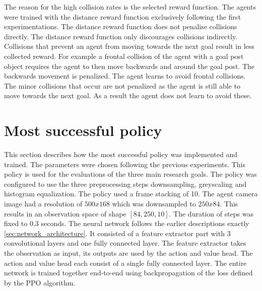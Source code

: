 The reason for the high collision rates is the selected reward function. The agents were trained with the distance reward function exclusively following the first experimentations. The distance reward function does not penalise collisions directly. The distance reward function only discourages collisions indirectly. Collisions that prevent an agent from moving towards the next goal result in less collected reward. For example a frontal collision of the agent with a goal post object requires the agent to then move backwards and around the goal post. The backwards movement is penalized. The agent learns to avoid frontal collisions.
The minor collisions that occur are not penalized as the agent is still able to move towards the next goal. As a result the agent does not learn to avoid these.




\section{Most successful policy}


This section describes how the most successful policy was implemented and trained. The parameters were chosen following the previous experiments. This policy is used for the evaluations of the three main research goals.
The policy was configured to use the three preprocessing steps downsampling, greyscaling and histogram equalization. The policy used a frame stacking of 10. The agent camera image had a resolution of $500x168$ which was downsampled to $250x84$. This results in an observation space of shape $[84, 250, 10]$. The duration of steps was fixed to $0.3$ seconds.
The neural network follows the earlier descriptions exactly \ref{sec:network_architecture}. It consisted of a feature extractor part with 3 convolutional layers and one fully connected layer. The feature extractor takes the observation as input, its outputs are used by the action and value head. The action and value head each consist of a single fully connected layer. The entire network is trained together end-to-end using backpropagation of the loss defined by the PPO algorithm.

